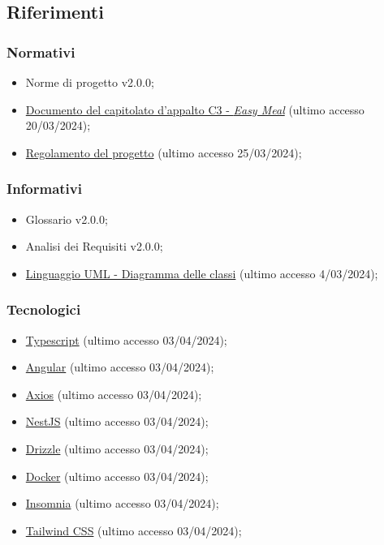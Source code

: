 \subsection{Riferimenti}
\subsubsection{Normativi}
\begin{itemize}
	\item Norme di progetto v2.0.0;
	\item 	\href{https://www.math.unipd.it/~tullio/IS-1/2023/Progetto/C3.pdf}
	      {Documento del capitolato d'appalto C3 - \textit{Easy Meal}} (ultimo accesso 20/03/2024);
	\item \href{https://www.math.unipd.it/~tullio/IS-1/2023/Dispense/PD2.pdf}
	      {Regolamento del progetto} (ultimo accesso 25/03/2024); 
\end{itemize}

\subsubsection{Informativi}
\begin{itemize}
	\item Glossario v2.0.0;
	\item Analisi dei Requisiti v2.0.0;
	\item \href{https://www.math.unipd.it/~rcardin/swea/2023/Diagrammi\%20delle\%20Classi.pdf}
	      {Linguaggio UML - Diagramma delle classi} (ultimo accesso 4/03/2024); 
\end{itemize}

\subsubsection{Tecnologici}
\begin{itemize}
	\item \href{https://www.typescriptlang.org/}
	      {Typescript} (ultimo accesso 03/04/2024);

	\item \href{https://angular.io/}
	      {Angular} (ultimo accesso 03/04/2024);

	\item \href{https://axios-http.com/}
	      {Axios} (ultimo accesso 03/04/2024);

	\item \href{https://nestjs.com/}
	      {NestJS} (ultimo accesso 03/04/2024);

	\item \href{https://orm.drizzle.team/}
	      {Drizzle} (ultimo accesso 03/04/2024);

	\item \href{https://www.docker.com/}
	      {Docker} (ultimo accesso 03/04/2024);

	\item \href{https://insomnia.rest/}
	      {Insomnia} (ultimo accesso 03/04/2024);

	\item \href{https://tailwindcss.com/}
	      {Tailwind CSS} (ultimo accesso 03/04/2024);
\end{itemize}